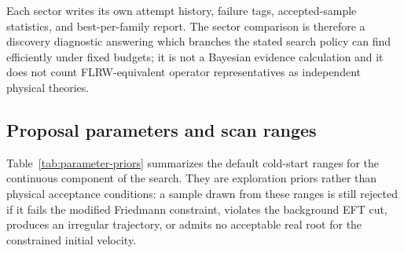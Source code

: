 \documentclass[aps,prd,twocolumn,superscriptaddress,nofootinbib,longbibliography]{revtex4-2}
\begin{document}
Each sector writes its own attempt history, failure tags, accepted-sample statistics, and best-per-family report.  The sector comparison is therefore a discovery diagnostic answering which branches the stated search policy can find efficiently under fixed budgets; it is not a Bayesian evidence calculation and it does not count FLRW-equivalent operator representatives as independent physical theories.


\subsection{Proposal parameters and scan ranges}
\label{subsec:parameter-priors}

Table~\ref{tab:parameter-priors} summarizes the default cold-start ranges for the continuous component of the search.  They are exploration priors rather than physical acceptance conditions: a sample drawn from these ranges is still rejected if it fails the modified Friedmann constraint, violates the background EFT cut, produces an irregular trajectory, or admits no acceptable real root for the constrained initial velocity.
\end{document}
